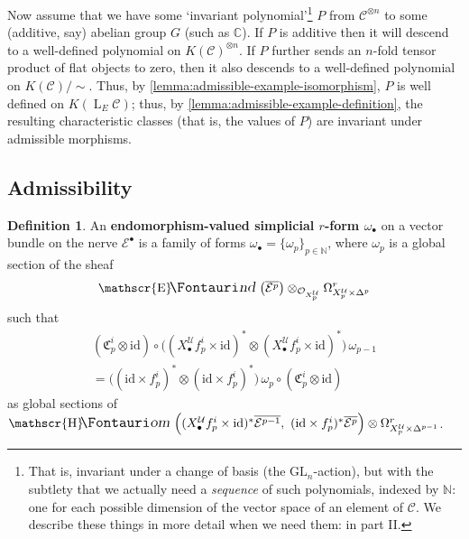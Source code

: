 \documentclass[11pt,fleqn]{article}
\theoremstyle{plain}
\theoremstyle{definition}
\newtheorem{definition}[theorem]{Definition}
\theoremstyle{remark}
\numberwithin{equation}{theorem}
\newcommand{\cover}{\mathcal{U}}
\newcommand{\OO}{\mathcal{O}}
\newcommand{\id}{\mathrm{id}}
\newcommand{\define}[1]{\textbf{#1}}
\newcommand{\nerve}[1]{X_{#1}^\cover}
\newcommand{\nervesimplex}[1]{\nerve{#1}\times\Delta^{#1}}
\newcommand{\comparison}[1]{\mathfrak{C}_{#1}}
\DeclareMathOperator{\LL}{L}
\DeclareMathOperator{\sheafhom}{\mathscr{H}\textup{\kern -2.5pt {\large\Fontauri\slshape om}}\,}
\DeclareMathOperator{\sheafend}{\mathscr{E}\textup{\kern -2pt {\large\Fontauri\slshape nd}}\,}
\begin{document}
        Now assume that we have some `invariant polynomial'\footnote{That is, invariant under a change of basis (the $\mathrm{GL}_n$-action), but with the subtlety that we actually need a \emph{sequence} of such polynomials, indexed by $\mathbb{N}$: one for each possible dimension of the vector space of an element of $\mathcal{C}$. We describe these things in more detail when we need them: in part II.} $P$ from $\mathcal{C}^{\otimes n}$ to some (additive, say) abelian group $G$ (such as $\mathbb{C}$).
        If $P$ is additive then it will descend to a well-defined polynomial on $K(\mathcal{C})^{\otimes n}$.
        If $P$ further sends an $n$-fold tensor product of flat objects to zero, then it also descends to a well-defined polynomial on $K(\mathcal{C})/\!\!\sim$.
        Thus, by \cref{lemma:admissible-example-isomorphism}, $P$ is well defined on $K(\LL_E\mathcal{C})$; thus, by \cref{lemma:admissible-example-definition}, the resulting characteristic classes (that is, the values of $P$) are invariant under admissible morphisms.


    \subsection{Admissibility}

        \begin{definition}
            An \define{endomorphism-valued simplicial $r$-form $\omega_\bullet$} on a vector bundle on the nerve $\mathcal{E}^\bullet$ is a family of forms $\omega_\bullet=\{\omega_p\}_{p\in\mathbb{N}}$, where $\omega_p$ is a global section of the sheaf
            \begin{equation*}
                \sheafend\left(\overline{\mathcal{E}^p}\right)\otimes_{\OO_{\nerve{p}}}\Omega_{\nervesimplex{p}}^r
            \end{equation*}
            such that
            \begin{gather*}
                (\comparison{p}^i\otimes\id)
                \circ
                \big( (\nerve{\bullet} f_p^i\times\id)^*\otimes (\nerve{\bullet} f_p^i\times\id)^* \big)
                \,\omega_{p-1}
            \\  = \big( (\id\times f_p^i)^*\otimes(\id\times f_p^i)^* \big)
                \,\omega_p
                \circ
                (\comparison{p}^i\otimes\id)
            \end{gather*}
            as global sections of $\sheafhom\left((\nerve{\bullet} f_p^i\times\id)^*\overline{\mathcal{E}^{p-1}},\,\,(\id\times f_p^i)^*\overline{\mathcal{E}^p}\right)\otimes\Omega_{\nerve{p}\times\Delta^{p-1}}^r$.
        \end{definition}
\end{document}
